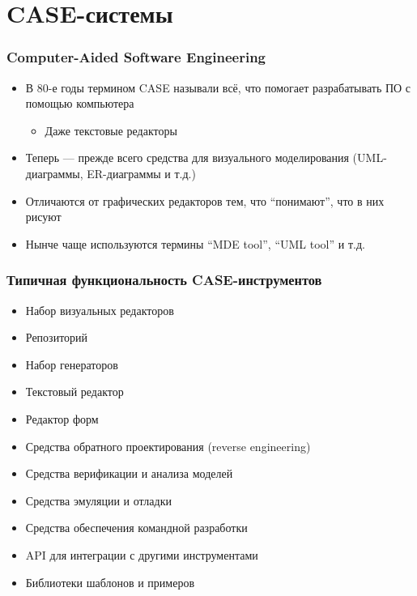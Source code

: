 \documentclass{../../slides-style}
\begin{document}
    \begin{frame}[plain]
        \titlepage
    \end{frame}

    \section{CASE-системы}
    
    \begin{frame}
        \frametitle{Computer-Aided Software Engineering}
        \begin{itemize}
            \item В 80-е годы термином CASE называли всё, что помогает разрабатывать ПО с помощью компьютера
            \begin{itemize}
                \item Даже текстовые редакторы
            \end{itemize}
            \item Теперь --- прежде всего средства для визуального моделирования (UML-диаграммы, ER-диаграммы и т.д.)
            \item Отличаются от графических редакторов тем, что ``понимают'', что в них рисуют
            \item Нынче чаще используются термины ``MDE tool'', ``UML tool'' и т.д.
        \end{itemize}
    \end{frame}

    \begin{frame}
        \frametitle{Типичная функциональность CASE-инструментов}
        \begin{itemize}
            \item Набор визуальных редакторов
            \item Репозиторий
            \item Набор генераторов
            \item Текстовый редактор
            \item Редактор форм
            \item Средства обратного проектирования (reverse engineering)
            \item Средства верификации и анализа моделей
            \item Средства эмуляции и отладки
            \item Средства обеспечения командной разработки
            \item API для интеграции с другими инструментами
            \item Библиотеки шаблонов и примеров
        \end{itemize}
    \end{frame}
\end{document}

